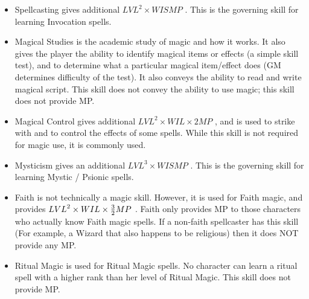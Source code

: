 \documentclass[twoside]{book}
\begin{document}
\begin{itemize}
      
  \item   Spellcasting gives additional \begin{math}    
                    {LVL}^{ 2 }   \times  WISMP
                         \end{math} . This is the governing skill
                      for learning Invocation spells.
              
  \item   Magical Studies is the academic study of magic
                 and how it works. It also gives the player the ability
                 to identify magical items or effects (a simple skill
                 test), and to determine what a particular magical
                 item/effect does (GM determines difficulty of the test).
                 It also conveys the ability to read and write magical
                 script. This skill does not convey the ability to use
                 magic; this skill does not provide MP. 
  \item   Magical Control gives additional \begin{math}    
                    {LVL}^{ 2 }   \times    WIL  
                      \times     2   MP  
                       \end{math} , and is used to strike with and to control
                      the effects of some spells. While this skill is not
                      required for magic use, it is commonly used.
              
  \item   Mysticism gives an additional \begin{math}    
                    {LVL}^{ 3 }   \times    WIS  MP
                         \end{math} . This is the governing skill
                      for learning Mystic / Psionic spells.
              
  \item   Faith is not technically a magic skill. However,
                 it is used for Faith magic, and provides \begin{math}  
                    {LVL}^{ 2 }   \times    WIL  
                      \times    {{ 3 }\over{ 2
                      }}  MP    \end{math} . Faith
                      only provides MP to those characters who actually
                      know Faith magic spells. If a non-faith spellcaster
                      has this skill (For example, a Wizard that also
                      happens to be religious) then it does NOT provide
                      any MP.
              
  \item   Ritual Magic is used for Ritual Magic spells. No
                 character can learn a ritual spell with a higher rank
                 than her level of Ritual Magic. This skill does not
                 provide MP. 
\end{itemize}
  
\end{document}
